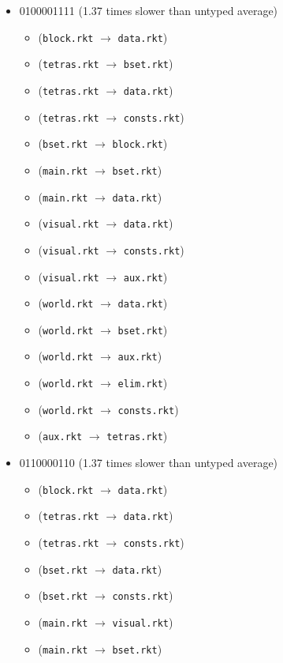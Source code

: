 \documentclass{article}
\newcommand{\mono}[1]{\texttt{#1}}
\begin{document}
\begin{itemize}
\begin{itemize}
  \end{itemize}
\item 0100001111 (1.37 times slower than untyped average)
  \begin{itemize}
  \item (\mono{block.rkt} $\rightarrow$ \mono{data.rkt})
  \item (\mono{tetras.rkt} $\rightarrow$ \mono{bset.rkt})
  \item (\mono{tetras.rkt} $\rightarrow$ \mono{data.rkt})
  \item (\mono{tetras.rkt} $\rightarrow$ \mono{consts.rkt})
  \item (\mono{bset.rkt} $\rightarrow$ \mono{block.rkt})
  \item (\mono{main.rkt} $\rightarrow$ \mono{bset.rkt})
  \item (\mono{main.rkt} $\rightarrow$ \mono{data.rkt})
  \item (\mono{visual.rkt} $\rightarrow$ \mono{data.rkt})
  \item (\mono{visual.rkt} $\rightarrow$ \mono{consts.rkt})
  \item (\mono{visual.rkt} $\rightarrow$ \mono{aux.rkt})
  \item (\mono{world.rkt} $\rightarrow$ \mono{data.rkt})
  \item (\mono{world.rkt} $\rightarrow$ \mono{bset.rkt})
  \item (\mono{world.rkt} $\rightarrow$ \mono{aux.rkt})
  \item (\mono{world.rkt} $\rightarrow$ \mono{elim.rkt})
  \item (\mono{world.rkt} $\rightarrow$ \mono{consts.rkt})
  \item (\mono{aux.rkt} $\rightarrow$ \mono{tetras.rkt})
  \end{itemize}
\item 0110000110 (1.37 times slower than untyped average)
  \begin{itemize}
  \item (\mono{block.rkt} $\rightarrow$ \mono{data.rkt})
  \item (\mono{tetras.rkt} $\rightarrow$ \mono{data.rkt})
  \item (\mono{tetras.rkt} $\rightarrow$ \mono{consts.rkt})
  \item (\mono{bset.rkt} $\rightarrow$ \mono{data.rkt})
  \item (\mono{bset.rkt} $\rightarrow$ \mono{consts.rkt})
  \item (\mono{main.rkt} $\rightarrow$ \mono{visual.rkt})
  \item (\mono{main.rkt} $\rightarrow$ \mono{bset.rkt})

\end{itemize}
\end{itemize}
\end{document}
